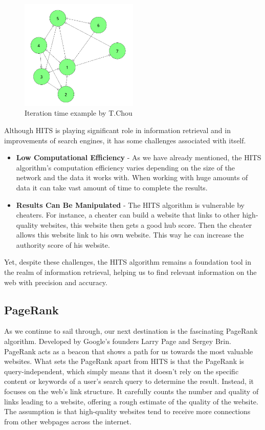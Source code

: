 \documentclass[10pt,english,a4paper]{article}
\begin{document}
\begin{figure}
  \centering
  \includegraphics[width=0.5\textwidth]{comp_time_1.png}
  \caption{Iteration time example by T.Chou\cite{hits_article}}
  \label{comp_time}
\end{figure}

Although HITS is playing significant role in information retrieval and in improvements of search engines, it has some challenges associated with itself.
\begin{itemize}
  \item \textbf{Low Computational Efficiency} - As we have already mentioned, the HITS algorithm's computation efficiency varies depending on the size of the network and the data it works with. When working with huge amounts of data it can take vast amount of time to complete the results.
  \item \textbf{Results Can Be Manipulated} - The HITS algorithm is vulnerable by cheaters. For instance, a cheater can build a website that links to other high-quality websites, this website then gets a good hub score. Then the cheater allows this website link to his own website. This way he can increase the authority score of his website.  
\end{itemize}
Yet, despite these challenges, the HITS algorithm remains a foundation tool in the realm of information retrieval, helping us to find relevant information on the web with precision and accuracy.\cite{hits_challenges_article}
\subsection{PageRank}\label{pagerank}
As we continue to sail through, our next destination is the fascinating PageRank algorithm. Developed by Google's founders Larry Page and Sergey Brin. PageRank acts as a beacon that shows a path for us towards the most valuable websites. What sets the PageRank apart from HITS is that the PageRank is query-independent, which simply means that it doesn't rely on the specific content or keywords of a user's search query to determine the result. Instead, it focuses on the web's link structure. It carefully counts the number and quality of links leading to a website, offering a rough estimate of the quality of the website. The assumption is that high-quality websites tend to receive more connections from other webpages across the internet.
\end{document}
